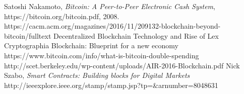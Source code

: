 \documentclass[report]{IEEEtran}
\begin{document}
\begin{thebibliography}{1}

Satoshi Nakamoto, \emph{Bitcoin: A Peer-to-Peer Electronic Cash System}, https://bitcoin.org/bitcoin.pdf, 2008.
https://cacm.acm.org/magazines/2016/11/209132-blockchain-beyond-bitcoin/fulltext
Decentralized Blockchain Technology and Rise of Lex Cryptographia
Blockchain: Blueprint for a new economy
https://www.bitcoin.com/info/what-is-bitcoin-double-spending
http://scet.berkeley.edu/wp-content/uploads/AIR-2016-Blockchain.pdf
Nick Szabo, \emph{Smart Contracts: Building blocks for Digital Markets}
http://ieeexplore.ieee.org/stamp/stamp.jsp?tp=&arnumber=8048631
\end{thebibliography}
\end{document}
